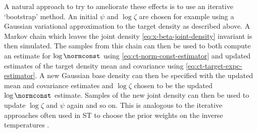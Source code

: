 A natural approach to try to ameliorate these effects is to use an iterative `bootstrap' method. An initial $\psi$ and $\log \zeta$ are chosen for example using a Gaussian variational approximation to the target density as described above. A Markov chain which leaves the joint density \eqref{eq:x-beta-joint-density} invariant is then simulated. The samples from this chain can then be used to both compute an estimate for $\log \normconst$ using \eqref{eq:ct-norm-const-estimator} and updated estimates of the target density mean and covariance using \eqref{eq:ct-target-expc-estimator}. A new Gaussian base density can then be specified with the updated mean and covariance estimates and $\log \zeta$ chosen to be the updated $\log \normconst$ estimate. Samples of the new joint density can then be used to update $\log \zeta$ and $\psi$ again and so on. This is analogous to the iterative approaches often used in \ac{ST} to choose the prior weights on the inverse temperatures \citep{geyer1995annealing,carlson2016partition}. 



